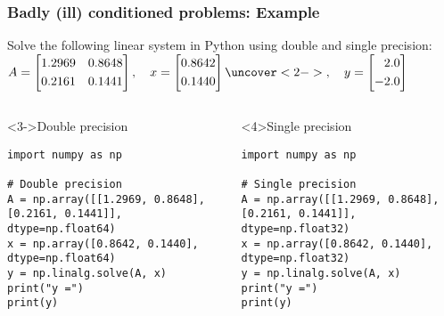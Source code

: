 \begin{frame}[fragile]
  \frametitle{Badly (ill) conditioned problems: Example}
  Solve the following linear system in Python using double and single precision:\\
  $ A = 
      \left[\begin{aligned}
       1.2969 & & 0.8648 \\%
       0.2161 & & 0.1441
      \end{aligned}\right], \quad 
     x = \left[\begin{aligned}
       0.8642  \\%
       0.1440 
     \end{aligned}\right]
     \uncover<2->{, \quad 
     y = \left[\begin{aligned}
       2.0 \\%
       -2.0 
     \end{aligned}\right]} $
\begin{columns}[T]
  \begin{block}<3->{Double precision}
    \begin{lstlisting}
import numpy as np

# Double precision
A = np.array([[1.2969, 0.8648], [0.2161, 0.1441]], dtype=np.float64)
x = np.array([0.8642, 0.1440], dtype=np.float64)
y = np.linalg.solve(A, x)
print("y =")
print(y)
    \end{lstlisting}
  \end{block}
  \pause 
    \begin{block}<4>{Single precision}
      \begin{lstlisting}
import numpy as np

# Single precision
A = np.array([[1.2969, 0.8648], [0.2161, 0.1441]], dtype=np.float32)
x = np.array([0.8642, 0.1440], dtype=np.float32)
y = np.linalg.solve(A, x)
print("y =")
print(y)
    \end{lstlisting}
  \end{block}
\end{columns}
\end{frame}

